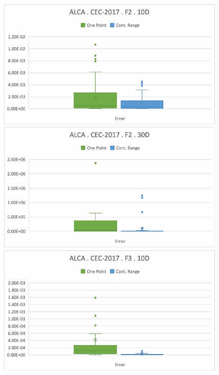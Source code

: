 \documentclass[graybox]{svmult}
\begin{document}
\begin{figure}[!ht]
\begin{minipage}[h]{0.49\linewidth}
        \end{minipage}
        \vfill
        \vspace{0.05 cm}
        \begin{minipage}[h]{0.49\linewidth}
            \includegraphics[width=1\linewidth]{img/fig_experiment_F2x10D.pdf} 
        \end{minipage}
        \hfill
        \begin{minipage}[h]{0.49\linewidth}
            \includegraphics[width=1\linewidth]{img/fig_experiment_F2x30D.pdf} 
        \end{minipage}
        \vfill
        \vspace{0.05 cm}
        \begin{minipage}[h]{0.49\linewidth}
            \includegraphics[width=1\linewidth]{img/fig_experiment_F3x10D.pdf} 

\end{minipage}
\end{figure}
\end{document}
